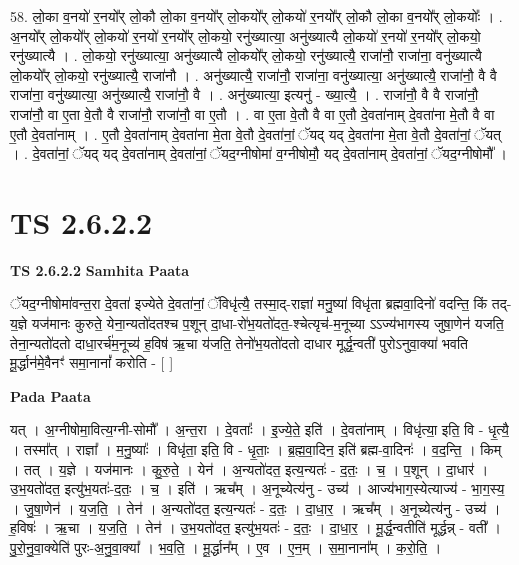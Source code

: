 \documentclass[17pt]{extarticle}
\begin{document}
58. लो॒का व॒नयो॑ र॒नयो᳚र् लो॒कौ लो॒का व॒नयो᳚र् लो॒कयो᳚र् लो॒कयो॑ र॒नयो᳚र् लो॒कौ लो॒का व॒नयो᳚र् लो॒कयोः᳚ । . अ॒नयो᳚र् लो॒कयो᳚र् लो॒कयो॑ र॒नयो॑ र॒नयो᳚र् लो॒कयो॒ रनु॑ख्यात्या॒ अनु॑ख्यात्यै लो॒कयो॑ र॒नयो॑ र॒नयो᳚र् लो॒कयो॒ रनु॑ख्यात्यै । . लो॒कयो॒ रनु॑ख्यात्या॒ अनु॑ख्यात्यै लो॒कयो᳚र् लो॒कयो॒ रनु॑ख्यात्यै॒ राजा॑नौ॒ राजा॑ना॒ वनु॑ख्यात्यै लो॒कयो᳚र् लो॒कयो॒ रनु॑ख्यात्यै॒ राजा॑नौ । . अनु॑ख्यात्यै॒ राजा॑नौ॒ राजा॑ना॒ वनु॑ख्यात्या॒ अनु॑ख्यात्यै॒ राजा॑नौ॒ वै वै राजा॑ना॒ वनु॑ख्यात्या॒ अनु॑ख्यात्यै॒ राजा॑नौ॒ वै । . अनु॑ख्यात्या॒ इत्यनु॑ - ख्या॒त्यै॒ । . राजा॑नौ॒ वै वै राजा॑नौ॒ राजा॑नौ॒ वा ए॒ता वे॒तौ वै राजा॑नौ॒ राजा॑नौ॒ वा ए॒तौ । . वा ए॒ता वे॒तौ वै वा ए॒तौ दे॒वता॑नाम् दे॒वता॑ना मे॒तौ वै वा ए॒तौ दे॒वता॑नाम् । . ए॒तौ दे॒वता॑नाम् दे॒वता॑ना मे॒ता वे॒तौ दे॒वता॑नां॒ ॅयद् यद् दे॒वता॑ना मे॒ता वे॒तौ दे॒वता॑नां॒ ॅयत् । . दे॒वता॑नां॒ ॅयद् यद् दे॒वता॑नाम् दे॒वता॑नां॒ ॅयद॒ग्नीषोमा॑ व॒ग्नीषोमौ॒ यद् दे॒वता॑नाम् दे॒वता॑नां॒ ॅयद॒ग्नीषोमौ᳚ । \newline
\pagebreak
{}

\section{ TS 2.6.2.2 }

\textbf{TS 2.6.2.2 } \newline
\textbf{Samhita Paata} \newline

ॅयद॒ग्नीषोमा॑वन्त॒रा दे॒वता॑ इज्येते दे॒वता॑नां॒ ॅविधृ॑त्यै॒ तस्मा॒द्-राज्ञा॑ मनु॒ष्या॑ विधृ॑ता ब्रह्मवा॒दिनो॑ वदन्ति॒ किं तद्-य॒ज्ञे यज॑मानः कुरुते॒ येना॒न्यतो॑दतश्च प॒शून् दा॒धा-रो॑भ॒यतो॑दत॒-श्चेत्यृच॑-म॒नूच्या ऽऽज्य॑भागस्य जुषा॒णेन॑ यजति॒ तेना॒न्यतो॑दतो दाधा॒रर्च॑म॒नूच्य॑ ह॒विष॑ ऋ॒चा य॑जति॒ तेनो॑भ॒यतो॑दतो दाधार मूर्द्ध॒न्वती॑ पुरोऽनुवा॒क्या॑ भवति मू॒र्द्धान॑मे॒वैनꣳ॑ समा॒नानां᳚ करोति - [  ] \newline

\textbf{Pada Paata} \newline

यत् । अ॒ग्नीषोमा॒वित्य॒ग्नी-सोमौ᳚ । अ॒न्त॒रा । दे॒वताः᳚ । इ॒ज्ये॒ते॒ इति॑ । दे॒वता॑नाम् । विधृ॑त्या॒ इति॒ वि - धृ॒त्यै॒ । तस्मा᳚त् । राज्ञा᳚ । म॒नु॒ष्याः᳚ । विधृ॑ता॒ इति॒ वि - धृ॒ताः॒ । ब्र॒ह्म॒वा॒दिन॒ इति॑ ब्रह्म-वा॒दिनः॑ । व॒द॒न्ति॒ । किम् । तत् । य॒ज्ञे । यज॑मानः । कु॒रु॒ते॒ । येन॑ । अ॒न्यतो॑दत॒ इत्य॒न्यतः॑ - द॒तः॒ । च॒ । प॒शून् । दा॒धार॑ । उ॒भ॒यतो॑दत॒ इत्यु॑भ॒यतः॑-द॒तः॒ । च॒ । इति॑ । ऋच᳚म् । अ॒नूच्येत्य॑नु - उच्य॑ । आज्य॑भाग॒स्येत्याज्य॑ - भा॒ग॒स्य॒ । जु॒षा॒णेन॑ । य॒ज॒ति॒ । तेन॑ । अ॒न्यतो॑दत॒ इत्य॒न्यतः॑ - द॒तः॒ । दा॒धा॒र॒ । ऋच᳚म् । अ॒नूच्येत्य॑नु - उच्य॑ । ह॒विषः॑ । ऋ॒चा । य॒ज॒ति॒ । तेन॑ । उ॒भ॒यतो॑दत॒ इत्यु॑भ॒यतः॑ - द॒तः॒ । दा॒धा॒र॒ । मू॒र्द्ध॒न्वतीति॑ मूर्द्धन्न् - वती᳚ । पु॒रो॒नु॒वा॒क्येति॑ पुरः-अ॒नु॒वा॒क्या᳚ । भ॒व॒ति॒ । मू॒र्द्धान᳚म् । ए॒व । ए॒न॒म् । स॒मा॒नाना᳚म् । क॒रो॒ति॒ ।  \newline
\end{document}
